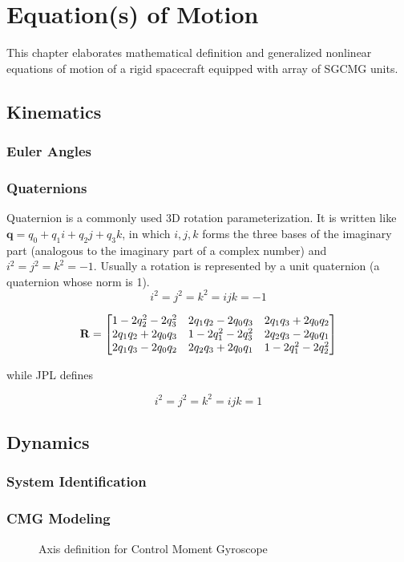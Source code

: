 \chapter{Equation(s) of Motion}
This chapter elaborates mathematical definition and generalized nonlinear equations of motion of a rigid spacecraft equipped with array of SGCMG units.

\section{Kinematics}
\subsection{Euler Angles}
\subsection{Quaternions}
Quaternion is a commonly used 3D rotation parameterization. It is written like $\mathbf{q}=q_0 + q_1 i + q_2 j + q_3 k$, in which $i, j, k$ forms the three bases of the imaginary part (analogous to the imaginary part of a complex number) and $i^2=j^2=k^2=-1$. Usually a rotation is represented by a unit quaternion (a quaternion whose norm is 1).
\[i^2=j^2=k^2=ijk=-1\]

\[{\bf R}=\begin{bmatrix} 1-2q_2^2-2q_3^2 & 2q_1q_2-2q_0q_3 & 2q_1q_3+2q_0q_2 \\ 2q_1q_2+2q_0q_3 & 1-2q_1^2-2q_3^2 & 2q_2q_3-2q_0q_1 \\ 2q_1q_3-2q_0q_2 & 2q_2q_3+2q_0q_1 & 1-2q_1^2-2q_2^2 \end{bmatrix}\]

while JPL defines

\[i^2=j^2=k^2=ijk=1\]


\section{Dynamics}
\subsection{System Identification}
\subsection{CMG Modeling}

\begin{figure}[!h]
    \centering
    
    \caption{Axis definition for Control Moment Gyroscope}
    \label{fig:tikCMG}
\end{figure}

